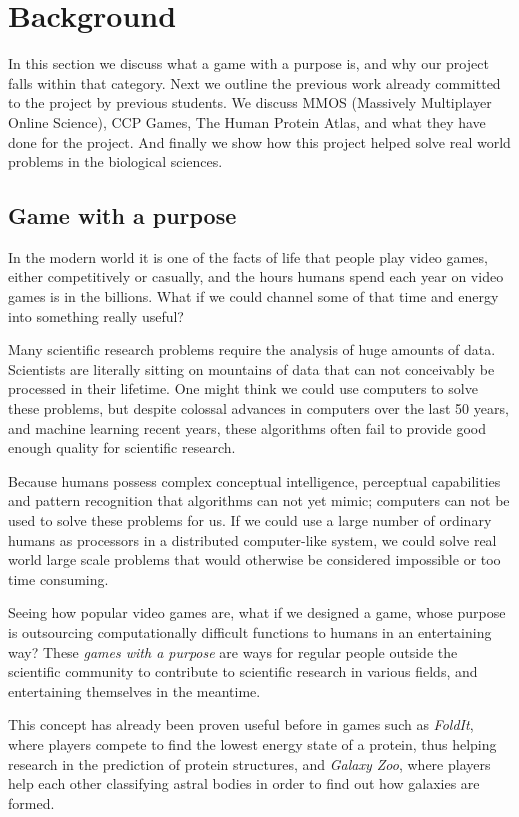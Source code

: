 \section{Background}\label{sec:background}
	In this section we discuss what a game with a purpose is, and why our project falls within that category.
	Next we outline the previous work already committed to the project by previous students.
	We discuss MMOS (Massively Multiplayer Online Science), CCP Games, The Human Protein Atlas, and what they have done for the project. And finally we show how this project helped solve real world problems in the biological sciences.

\subsection{Game with a purpose}
	In the modern world it is one of the facts of life that people play video games, either competitively or casually, and the hours humans spend each year on video games is in the billions. What if we could channel some of that time and energy into something really useful?

	Many scientific research problems require the analysis of huge amounts of data. Scientists are literally sitting on mountains of data that can not conceivably be processed in their lifetime. One might think we could use computers to solve these problems, but despite colossal advances in computers over the last 50 years, and machine learning recent years, these algorithms often fail to provide good enough quality for scientific research.

	Because humans possess complex conceptual intelligence, perceptual capabilities and pattern recognition that algorithms can not yet mimic; computers can not be used to solve these problems for us. If we could use a large number of ordinary humans as processors in a distributed computer-like system, we could solve real world large scale problems that would otherwise be considered impossible or too time consuming.

	Seeing how popular video games are, what if we designed a game, whose purpose is outsourcing computationally difficult functions to humans in an entertaining way? These \emph{games with a purpose} are ways for regular people outside the scientific community to contribute to scientific research in various fields, and entertaining themselves in the meantime.

	This concept has already been proven useful before in games such as \emph{FoldIt}, where players compete to find the lowest energy state of a protein, thus helping research in the prediction of protein structures, and \emph{Galaxy Zoo}, where players help each other classifying astral bodies in order to find out how galaxies are formed.

